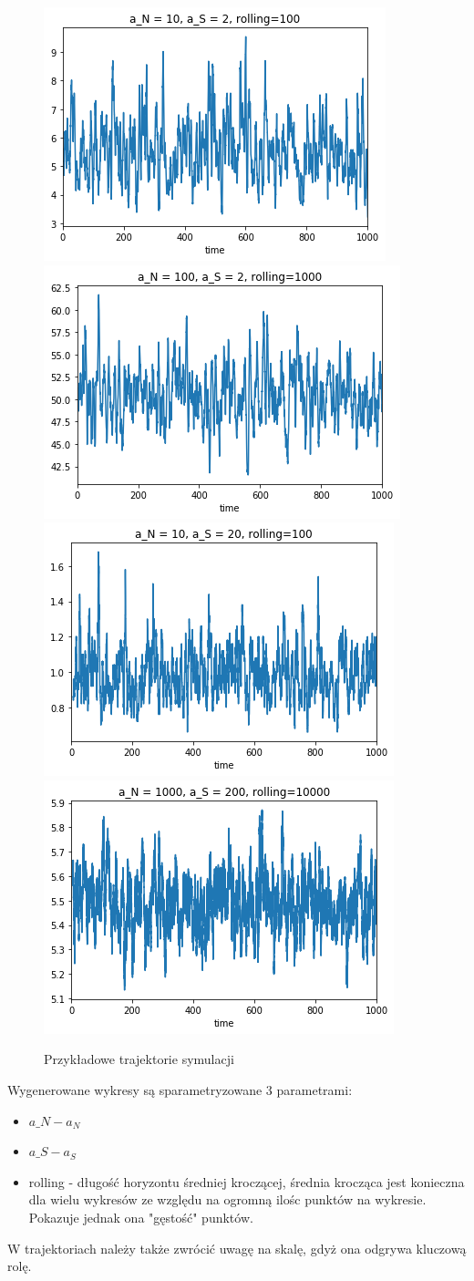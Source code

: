 \documentclass{article}
\begin{document}
\begin{figure}[h!]
\centering
\includegraphics[width=0.4\linewidth]{10,2}
\includegraphics[width=0.4\linewidth]{100,2}
\includegraphics[width=0.4\linewidth]{10,20}
\includegraphics[width=0.4\linewidth]{1000,200}
\caption{Przykładowe trajektorie symulacji}
\end{figure}
Wygenerowane wykresy są sparametryzowane 3 parametrami: \begin{itemize}
\item $a\_N - a_N$
\item $a\_S - a_S$
\item rolling - długość horyzontu średniej kroczącej, średnia krocząca jest konieczna dla wielu wykresów ze względu na ogromną ilośc punktów na wykresie. Pokazuje jednak ona "gęstość" punktów.
\end{itemize}
W trajektoriach należy także zwrócić uwagę na skalę, gdyż ona odgrywa kluczową rolę.
\end{document}

